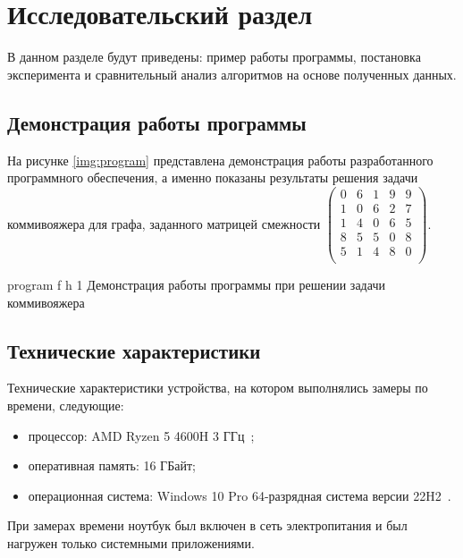 \chapter{Исследовательский раздел}

В данном разделе будут приведены: пример работы программы, постановка эксперимента и сравнительный анализ алгоритмов на основе полученных данных.

\section{Демонстрация работы программы}

На рисунке \ref{img:program} представлена демонстрация работы разработанного программного обеспечения, а именно показаны результаты решения задачи коммивояжера для графа, заданного матрицей смежности $\begin{pmatrix}
	0 & 6 & 1 & 9 & 9 \\
	1 & 0 & 6 & 2 & 7 \\
	1 & 4 & 0 & 6 & 5 \\
	8 & 5 & 5 & 0 & 8 \\
	5 & 1 & 4 & 8 & 0 \\
\end{pmatrix}$.  
\clearpage

{program} %
{f} %
{h} %
{1\textwidth} %
{Демонстрация работы программы при решении задачи коммивояжера} %

\clearpage


\section{Технические характеристики}

Технические характеристики устройства, на котором выполнялись замеры по времени, следующие:
\begin{itemize}
	\item процессор: AMD Ryzen 5 4600H 3 ГГц~\cite{amd};
	\item оперативная память: 16 ГБайт;
	\item операционная система: Windows 10 Pro 64-разрядная система версии 22H2~\cite{windows}.
\end{itemize}

При замерах времени ноутбук был включен в сеть электропитания и был нагружен только системными приложениями.

